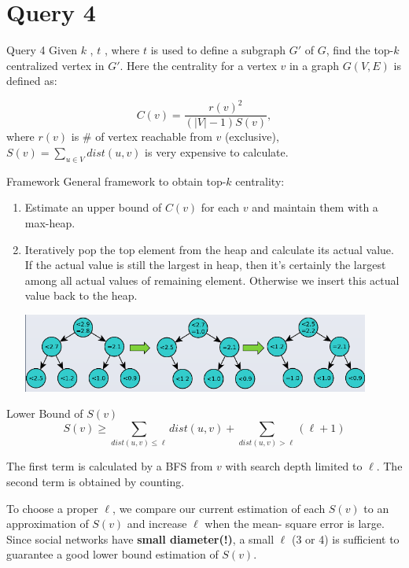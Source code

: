 
\section{Query 4}
\begin{frame}{Query 4}
  Given $k$ , $t$ , where $t$ is used to define a subgraph $G′$ of $G$, find
  the top-$k$ centralized vertex in $G′$. Here the centrality for a
  vertex $v$ in a graph $G(V, E)$ is defined as:

  \[ C(v) = \dfrac{r(v)^2}{(|V| - 1) S(v)},\]
    where $ r(v)$ is \# of vertex reachable from $v$ (exclusive),
 $ S(v) = \sum_{u\in V} dist(u, v) $ is very expensive to calculate.

\end{frame}

\begin{frame}{Framework}
  General framework to obtain top-$k$ centrality:
  \begin{enumerate}
    \item
      Estimate an upper bound of $C(v)$
      for each $v$ and maintain them with a max-heap.

    \item

      Iteratively pop the top element from the heap and calculate
      its actual value. If the actual value is still the largest in
      heap, then it's certainly the largest among all actual values
      of remaining element. Otherwise we insert this actual value
      back to the heap.
      \begin{center}
        \includegraphics[width=0.9\textwidth]{res/heap.png}
      \end{center}
  \end{enumerate}

\end{frame}

\begin{frame}{Lower Bound of $ S(v)$}
  \[ S(v) \ge \sum_{dist(u, v) \le \ell}dist(u, v) + \sum_{dist(u,v)>\ell}(\ell + 1) \]

The first term is calculated by a BFS from $v$ with search depth
limited to $\ell$. The second term is obtained by counting.

To choose a proper $\ell$, we compare our current estimation of each
$S(v)$ to an approximation of $S(v)$ and increase $\ell$ when the mean-
square error is large. Since social networks have \textbf{small
  diameter(!)}, a small $\ell$ (3 or 4) is sufficient to guarantee a good
lower bound estimation of $S(v)$.

\end{frame}

